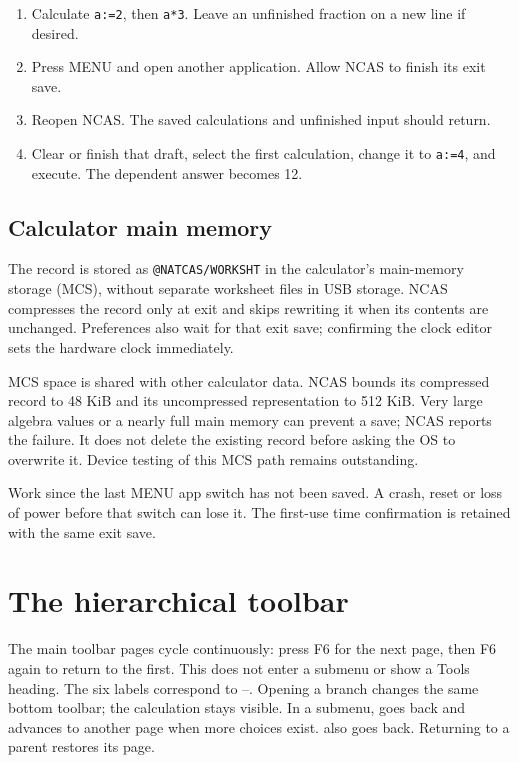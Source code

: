 \documentclass[11pt,a4paper]{article}
\newcommand{\key}[1]{\textsf{\fbox{\strut\scriptsize #1}}}
\newcommand{\note}[1]{\par\colorbox{pale}{\parbox{0.95\linewidth}{\small #1}}\par}
\begin{document}
\begin{enumerate}
\item Calculate \texttt{a:=2}, then \texttt{a*3}. Leave an unfinished fraction on a new line if desired.
\item Press MENU and open another application. Allow NCAS to finish its exit save.
\item Reopen NCAS. The saved calculations and unfinished input should return.
\item Clear or finish that draft, select the first calculation, change it to \texttt{a:=4}, and execute. The dependent answer becomes 12.
\end{enumerate}

\subsection{Calculator main memory}
The record is stored as \texttt{@NATCAS/WORKSHT} in the calculator's main-memory storage (MCS), without separate worksheet files in USB storage. NCAS compresses the record only at exit and skips rewriting it when its contents are unchanged. Preferences also wait for that exit save; confirming the clock editor sets the hardware clock immediately.

MCS space is shared with other calculator data. NCAS bounds its compressed record to 48 KiB and its uncompressed representation to 512 KiB. Very large algebra values or a nearly full main memory can prevent a save; NCAS reports the failure. It does not delete the existing record before asking the OS to overwrite it. Device testing of this MCS path remains outstanding.

\note{Work since the last MENU app switch has not been saved. A crash, reset or loss of power before that switch can lose it. The first-use time confirmation is retained with the same exit save.}
\clearpage

\section{The hierarchical toolbar}
The main toolbar pages cycle continuously: press F6 for the next page, then F6 again to return to the first. This does not enter a submenu or show a Tools heading. The six labels correspond to \key{F1}--\key{F6}. Opening a branch changes the same bottom toolbar; the calculation stays visible. In a submenu, \key{F1} goes back and \key{F6} advances to another page when more choices exist. \key{EXIT} also goes back. Returning to a parent restores its page.
\end{document}
